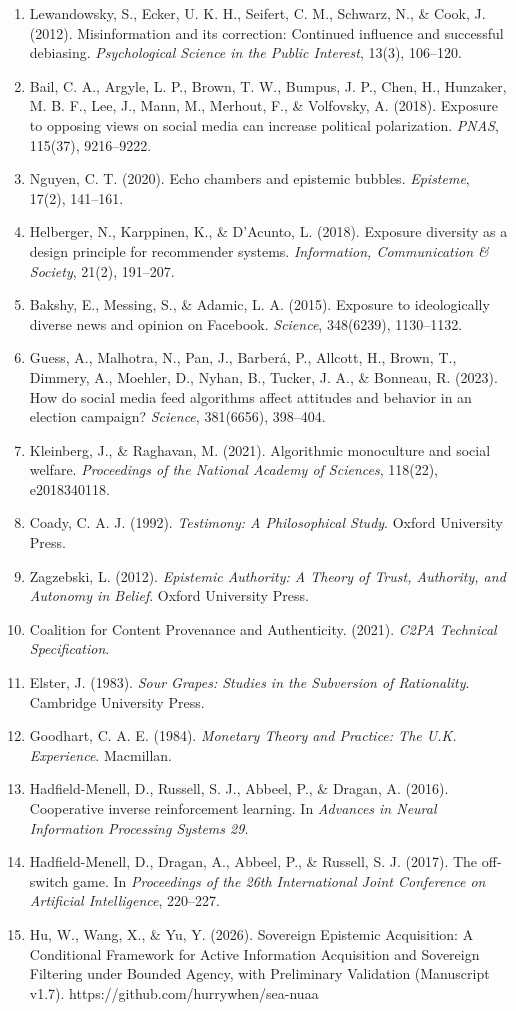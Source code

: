 \documentclass[
  chinese,
  11pt]{article}
\begin{document}
\begin{enumerate}
\item
  Lewandowsky, S., Ecker, U. K. H., Seifert, C. M., Schwarz, N., \& Cook, J. (2012). Misinformation and its correction: Continued influence and successful debiasing. \emph{Psychological Science in the Public Interest}, 13(3), 106--120.
\item
  Bail, C. A., Argyle, L. P., Brown, T. W., Bumpus, J. P., Chen, H., Hunzaker, M. B. F., Lee, J., Mann, M., Merhout, F., \& Volfovsky, A. (2018). Exposure to opposing views on social media can increase political polarization. \emph{PNAS}, 115(37), 9216--9222.
\item
  Nguyen, C. T. (2020). Echo chambers and epistemic bubbles. \emph{Episteme}, 17(2), 141--161.
\item
  Helberger, N., Karppinen, K., \& D'Acunto, L. (2018). Exposure diversity as a design principle for recommender systems. \emph{Information, Communication \& Society}, 21(2), 191--207.
\item
  Bakshy, E., Messing, S., \& Adamic, L. A. (2015). Exposure to ideologically diverse news and opinion on Facebook. \emph{Science}, 348(6239), 1130--1132.
\item
  Guess, A., Malhotra, N., Pan, J., Barberá, P., Allcott, H., Brown, T., Dimmery, A., Moehler, D., Nyhan, B., Tucker, J. A., \& Bonneau, R. (2023). How do social media feed algorithms affect attitudes and behavior in an election campaign? \emph{Science}, 381(6656), 398--404.
\item
  Kleinberg, J., \& Raghavan, M. (2021). Algorithmic monoculture and social welfare. \emph{Proceedings of the National Academy of Sciences}, 118(22), e2018340118.
\item
  Coady, C. A. J. (1992). \emph{Testimony: A Philosophical Study}. Oxford University Press.
\item
  Zagzebski, L. (2012). \emph{Epistemic Authority: A Theory of Trust, Authority, and Autonomy in Belief}. Oxford University Press.
\item
  Coalition for Content Provenance and Authenticity. (2021). \emph{C2PA Technical Specification}.
\item
  Elster, J. (1983). \emph{Sour Grapes: Studies in the Subversion of Rationality}. Cambridge University Press.
\item
  Goodhart, C. A. E. (1984). \emph{Monetary Theory and Practice: The U.K. Experience}. Macmillan.
\item
  Hadfield-Menell, D., Russell, S. J., Abbeel, P., \& Dragan, A. (2016). Cooperative inverse reinforcement learning. In \emph{Advances in Neural Information Processing Systems 29}.
\item
  Hadfield-Menell, D., Dragan, A., Abbeel, P., \& Russell, S. J. (2017). The off-switch game. In \emph{Proceedings of the 26th International Joint Conference on Artificial Intelligence}, 220--227.
\item
  Hu, W., Wang, X., \& Yu, Y. (2026). Sovereign Epistemic Acquisition: A Conditional Framework for Active Information Acquisition and Sovereign Filtering under Bounded Agency, with Preliminary Validation (Manuscript v1.7). https://github.com/hurrywhen/sea-nuaa
\end{enumerate}
\end{document}

